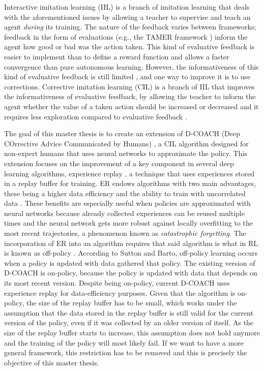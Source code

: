 Interactive imitation learning (IIL) is a branch of imitation learning \cite{lazydagger:2021} that deals with the aforementioned issues by allowing a teacher to supervise and teach an agent \textit{during} its training. The nature of the feedback varies between frameworks; feedback in the form of evaluations (e.g., the TAMER framework \cite{TAMER-Knox-Stone:2009}) inform the agent how good or bad was the action taken. This kind of evaluative feedback is easier to implement than to define a reward function and allows a faster convergence than pure autonomous learning. However, the informativeness of this kind of evaluative feedback is still limited \cite{types-feedback-najar:2020}, and one way to improve it is to use corrections. Corrective imitation learning (CIL) is a branch of IIL that improves the informativeness of evaluative feedback, by allowing the teacher to inform the agent whether the value of a taken action should be increased or decreased \cite{Relative-corrections-Celemin:2019} and it requires less exploration compared to evaluative feedback \cite{types-feedback-najar:2020}.

\setlength{\parskip}{1em}



The goal of this master thesis is to create an extension of D-COACH (Deep COrrective Advice Communicated by Humans) \cite{ResearchAssignmentpaper}, a CIL algorithm designed for non-expert humans that uses neural networks to approximate the policy. This extension focuses on the improvement of a key component in several deep learning algorithms, experience replay \cite{Atari-RL}, a technique that uses experiences stored in a replay buffer for training. ER endows algorithms with two main advantages, these being a higher data efficiency and the ability to train with uncorrelated data \cite{Experience-Replay-zhang:2018}. These benefits are especially useful when policies are approximated with neural networks because already collected experiences can be reused multiple times and the neural network gets more robust against locally overfitting to the most recent trajectories, a phenomenon known as \textit{catastrophic forgetting}. The incorporation of ER into an algorithm requires that said algorithm is what in RL is known as off-policy \cite{Sutton:1998}. According to Sutton and Barto, off-policy learning occurs when a policy is updated with data gathered  that policy. The existing version of D-COACH is on-policy, because the policy is updated with data that depends on its most recent version. Despite being on-policy, current D-COACH uses experience replay for data-efficiency purposes. Given that the algorithm is on-policy, the size of the replay buffer has to be small, which works under the assumption that the data stored in the replay buffer is still valid for the current version of the policy, even if it was collected by an older version of itself. As the size of the replay buffer starts to increase, this assumption does not hold anymore and the training of the policy will most likely fail. If we want to have a more general framework, this restriction has to be removed and this is precisely the objective of this master thesis.




